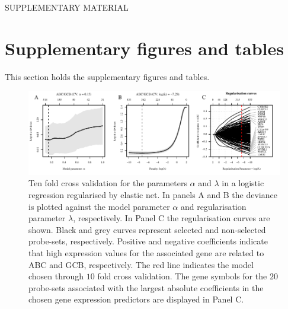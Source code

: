 \documentclass{article}
\begin{document}
\renewcommand{\theequation}{S\arabic{equation}}
\renewcommand{\thefigure}{S\arabic{figure}}
\renewcommand{\thetable}{S\arabic{table}}
\renewcommand{\thesection}{S\arabic{section}}

\setcounter{section}{0}
\setcounter{subsection}{0}
\setcounter{equation}{0}
\setcounter{figure}{0}
\setcounter{table}{0}
\setcounter{page}{1}


{}
\begin{center}
{\huge SUPPLEMENTARY MATERIAL}\bigskip \\
{\bf \hemaClassTitle{}}
\end{center}

\section{Supplementary figures and tables}
This section holds the supplementary figures and tables.

\begin{figure}[htb]
\begin{center}
\includegraphics[width=1\textwidth]{figures/CrosvalidationClass.pdf}
\end{center}
\caption{Ten fold cross validation for the parameters $\alpha$ and $\lambda$ in a logistic regression regularised by elastic net.
In panels A and B the deviance is plotted against the model parameter $\alpha$ and regularisation parameter $\lambda$, respectively.
In Panel C the regularisation curves are shown.
Black and grey curves represent selected and non-selected probe-sets, respectively.
Positive and negative coefficients indicate that high expression values for the associated gene are related to ABC and GCB, respectively.
The red line indicates the model chosen through $10$ fold cross validation.
The gene symbols for the $20$ probe-sets associated with the largest absolute coefficients in the chosen gene expression predictors are displayed in Panel C.}
\label{fig:crossval}
\end{figure}
\end{document}
